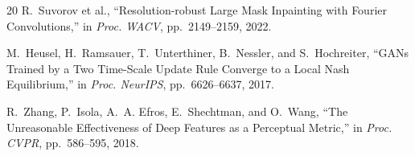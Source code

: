 \documentclass[11pt, a4paper]{article}
\begin{document}
\begin{thebibliography}{20}
R.~Suvorov et al.,
``Resolution-robust Large Mask Inpainting with Fourier Convolutions,''
in \textit{Proc. WACV}, pp.~2149--2159, 2022.

M.~Heusel, H.~Ramsauer, T.~Unterthiner, B.~Nessler, and S.~Hochreiter,
``GANs Trained by a Two Time-Scale Update Rule Converge to a Local Nash Equilibrium,''
in \textit{Proc. NeurIPS}, pp.~6626--6637, 2017.

R.~Zhang, P.~Isola, A.~A. Efros, E.~Shechtman, and O.~Wang,
``The Unreasonable Effectiveness of Deep Features as a Perceptual Metric,''
in \textit{Proc. CVPR}, pp.~586--595, 2018.

\end{thebibliography}
\end{document}
